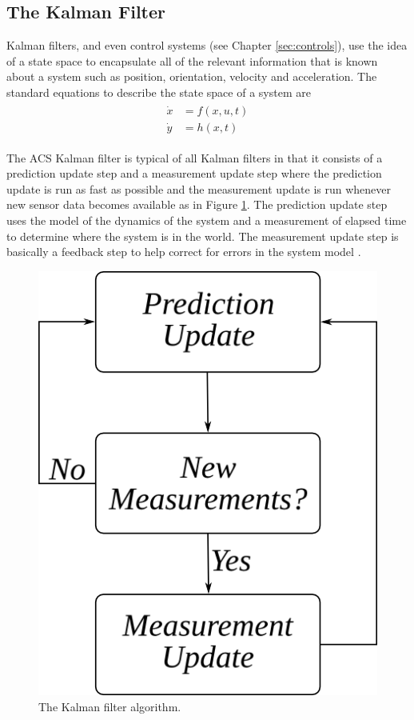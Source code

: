 \documentclass[12pt]{report}
\begin{document}
\begin{spacing}{1.1}
\section{The Kalman Filter}
Kalman filters, and even control systems (see Chapter \ref{sec:controls}), use the idea of a state space to encapsulate all of the relevant information that is known about a system such as position, orientation, velocity and acceleration. The standard equations to describe the state space of a system are
\begin{align}
\label{eq:statespace}
\begin{split}
\dot{x} &= f(x,u,t) \\
\dot{y} &= h(x,t)
\end{split}
\end{align}

The ACS Kalman filter is typical of all Kalman filters in that it consists of a prediction update step and a measurement update step where the prediction update is run as fast as possible and the measurement update is run whenever new sensor data becomes available as in Figure \ref{fig:kf}. The prediction update step uses the model of the dynamics of the system and a measurement of elapsed time to determine where the system is in the world. The measurement update step is basically a feedback step to help correct for errors in the system model \cite{Kelly_1994_338}.

\begin{figure}[ht!]
	\centering
	\includegraphics[width=.4\textwidth]{images/kf}
	\caption{The Kalman filter algorithm.}
	\label{fig:kf}
\end{figure}


\end{spacing}
\end{document}
